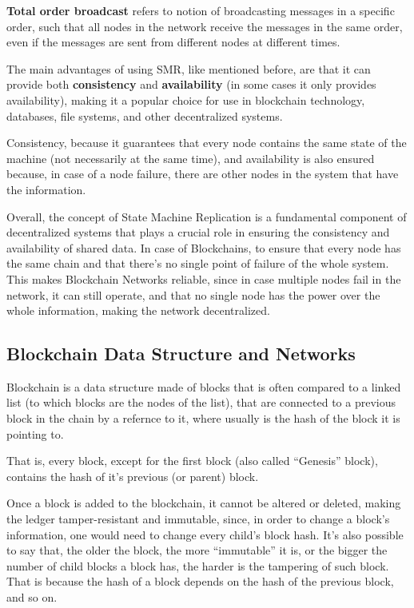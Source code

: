 \textbf{Total order broadcast} refers to notion of broadcasting messages in a specific order, such that all nodes in the network receive the messages in the same order, even if the messages are sent from different nodes at different times.

The main advantages of using SMR, like mentioned before, are that it can provide both \textbf{consistency} and \textbf{availability} (in some cases it only provides availability), making it a popular choice for use in blockchain technology, databases, file systems, and other decentralized systems.

Consistency, because it guarantees that every node contains the same state of the machine (not necessarily at the same time), and availability is also ensured because, in case of a node failure, there are other nodes in the system that have the information.

Overall, the concept of State Machine Replication is a fundamental component of decentralized systems that plays a crucial role in ensuring the consistency and availability of shared data. In case of Blockchains, to ensure that every node has the same chain and that there's no single point of failure of the whole system. This makes Blockchain Networks reliable, since in case multiple nodes fail in the network, it can still operate, and that no single node has the power over the whole information, making the network decentralized. 


\subsection*{\textbf{Blockchain Data Structure and Networks}}
Blockchain is a data structure made of blocks that is often compared to a linked list (to which blocks are the nodes of the list), that are connected to a previous block in the chain by a refernce to it, where usually is the hash of the block it is pointing to.

That is, every block, except for the first block (also called ``Genesis'' block), contains the hash of it's previous (or parent) block.

Once a block is added to the blockchain, it cannot be altered or deleted, making the ledger tamper-resistant and immutable, since, in order to change a block's information, one would need to change every child's block hash.
It's also possible to say that, the older the block, the more ``immutable'' it is, or the bigger the number of child blocks a block has, the harder is the tampering of such block. That is because the hash of a block depends on the hash of the previous block, and so on.

